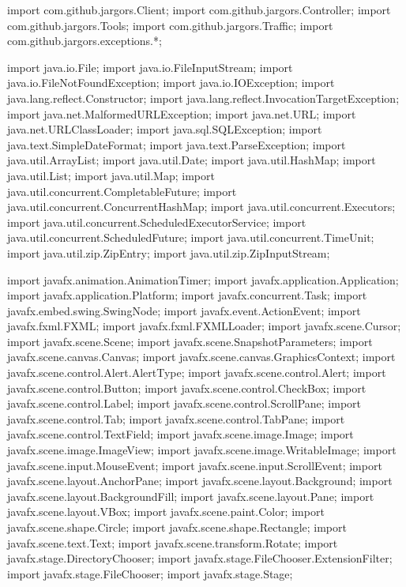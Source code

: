 \nwenddocs{}\plusendmoddef
import com.github.jargors.Client;
import com.github.jargors.Controller;
import com.github.jargors.Tools;
import com.github.jargors.Traffic;
import com.github.jargors.exceptions.*;
\nwendcode{}\nwdocspar

\nwenddocs{}\plusendmoddef
import java.io.File;
import java.io.FileInputStream;
import java.io.FileNotFoundException;
import java.io.IOException;
import java.lang.reflect.Constructor;
import java.lang.reflect.InvocationTargetException;
import java.net.MalformedURLException;
import java.net.URL;
import java.net.URLClassLoader;
import java.sql.SQLException;
import java.text.SimpleDateFormat;
import java.text.ParseException;
import java.util.ArrayList;
import java.util.Date;
import java.util.HashMap;
import java.util.List;
import java.util.Map;
import java.util.concurrent.CompletableFuture;
import java.util.concurrent.ConcurrentHashMap;
import java.util.concurrent.Executors;
import java.util.concurrent.ScheduledExecutorService;
import java.util.concurrent.ScheduledFuture;
import java.util.concurrent.TimeUnit;
import java.util.zip.ZipEntry;
import java.util.zip.ZipInputStream;
\nwendcode{}\nwdocspar

\nwenddocs{}\plusendmoddef
import javafx.animation.AnimationTimer;
import javafx.application.Application;
import javafx.application.Platform;
import javafx.concurrent.Task;
import javafx.embed.swing.SwingNode;
import javafx.event.ActionEvent;
import javafx.fxml.FXML;
import javafx.fxml.FXMLLoader;
import javafx.scene.Cursor;
import javafx.scene.Scene;
import javafx.scene.SnapshotParameters;
import javafx.scene.canvas.Canvas;
import javafx.scene.canvas.GraphicsContext;
import javafx.scene.control.Alert.AlertType;
import javafx.scene.control.Alert;
import javafx.scene.control.Button;
import javafx.scene.control.CheckBox;
import javafx.scene.control.Label;
import javafx.scene.control.ScrollPane;
import javafx.scene.control.Tab;
import javafx.scene.control.TabPane;
import javafx.scene.control.TextField;
import javafx.scene.image.Image;
import javafx.scene.image.ImageView;
import javafx.scene.image.WritableImage;
import javafx.scene.input.MouseEvent;
import javafx.scene.input.ScrollEvent;
import javafx.scene.layout.AnchorPane;
import javafx.scene.layout.Background;
import javafx.scene.layout.BackgroundFill;
import javafx.scene.layout.Pane;
import javafx.scene.layout.VBox;
import javafx.scene.paint.Color;
import javafx.scene.shape.Circle;
import javafx.scene.shape.Rectangle;
import javafx.scene.text.Text;
import javafx.scene.transform.Rotate;
import javafx.stage.DirectoryChooser;
import javafx.stage.FileChooser.ExtensionFilter;
import javafx.stage.FileChooser;
import javafx.stage.Stage;
\nwendcode{}\nwdocspar

